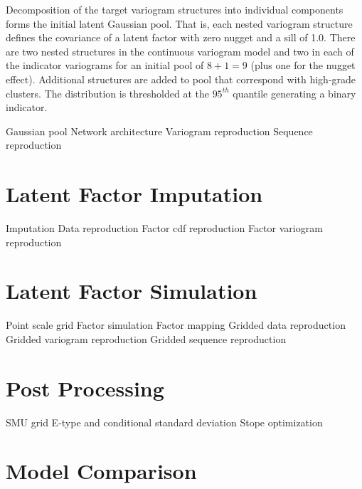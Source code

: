 Decomposition of the target variogram structures into individual components forms the initial latent Gaussian pool. That is, each nested variogram structure defines the covariance of a latent factor with zero nugget and a sill of 1.0. There are two nested structures in the continuous variogram model and two in each of the indicator variograms for an initial pool of $8 + 1 = 9$ (plus one for the nugget effect). Additional structures are added to pool that correspond with high-grade clusters. The distribution is thresholded at the $95^{th}$ quantile generating a binary indicator.


Gaussian pool
Network architecture
Variogram reproduction
Sequence reproduction


\section{Latent Factor Imputation}
\label{sec:fact_imp}

Imputation
Data reproduction
Factor cdf reproduction
Factor variogram reproduction

\section{Latent Factor Simulation}
\label{sec:fact_sim}

Point scale grid
Factor simulation
Factor mapping
Gridded data reproduction
Gridded variogram reproduction
Gridded sequence reproduction

\section{Post Processing}
\label{sec:post}

SMU grid
E-type and conditional standard deviation
Stope optimization


\section{Model Comparison}
\label{sec:compare}